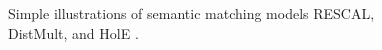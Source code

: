 \begin{figure}[h]
    
    \caption{Simple illustrations of semantic matching models RESCAL, DistMult, and HolE \parencite{ZHANG2024123876}.}
    \label{fig:semantic_maching_models}
\end{figure}